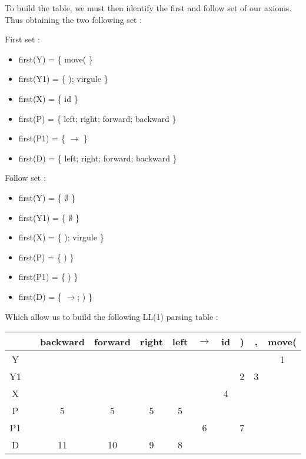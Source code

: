 \documentclass[a4paper, 11pt]{article}
\begin{document}
	To build the table, we must then identify the first and follow set of our axioms.
	Thus obtaining the two following set :

	\begin{minipage}{0.45\linewidth}
		First set :
		\begin{itemize}
			\item first(Y) = \{ move( \}
			\item first(Y1) = \{ ); virgule \}
			\item first(X) = \{ id \}
			\item first(P) = \{ left; right; forward; backward \}
			\item first(P1) = \{ $\rightarrow$ \}
			\item first(D) = \{ left; right; forward; backward \}
		\end{itemize}
	\end{minipage}
	
	\begin{minipage}{0.45\linewidth}
		Follow set :
		\begin{itemize}
			\item first(Y) = \{ $\emptyset$ \}
			\item first(Y1) = \{  $\emptyset$ \}
			\item first(X) = \{ ); virgule \}
			\item first(P) = \{ ) \}
			\item first(P1) = \{ ) \}
			\item first(D) = \{ $\rightarrow$; ) \}
		\end{itemize}
	\end{minipage}
	
	Which allow us to build the following LL(1) parsing table :
	
	\begin{center}
  		\begin{tabular}{ | c || c | c | c | c | c | c | c | c | c | c |}
    		\hline
    		& & backward & forward & right & left & $\rightarrow$ & id & ) & , & move( 
    		\\ \hline
    		Y 	& & & & & & & & & & 1\\ \hline
    		Y1 	& & & & & & & & 2 & 3 &  \\ \hline
    		X 	& & & & & & & 4 & & &  \\ \hline
    		P 	& & 5 & 5 & 5 & 5 & & & & &  \\ \hline
    		P1 	& & & & & & 6 & & 7 & &  \\ \hline
    		D 	& & 11 & 10 & 9 & 8 & & & & &  \\ \hline
  		\end{tabular}
		\end{center}
	
\end{document}
